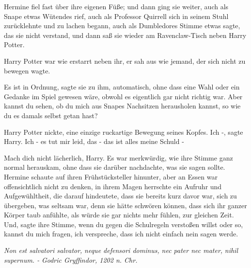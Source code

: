 Hermine fiel fast über ihre eigenen Füße; und dann ging sie weiter, auch als
Snape etwas Wütendes rief, auch als Professor Quirrell sich in seinem Stuhl
zurücklehnte und zu lachen begann, auch als Dumbledores Stimme etwas sagte, das
sie nicht verstand, und dann saß sie wieder am Ravenclaw-Tisch neben Harry
Potter.

Harry Potter war wie erstarrt neben ihr, er sah aus wie jemand, der sich nicht
zu bewegen wagte.

\glqq{}Es ist in Ordnung\grqq{}, sagte sie zu ihm, automatisch, ohne dass eine
Wahl oder ein Gedanke im Spiel gewesen wäre, obwohl es eigentlich gar nicht
richtig war. \glqq{}Aber kannst du sehen, ob du mich aus Snapes Nachsitzen
herausholen kannst, so wie du es damals selbst getan hast?\grqq{}

Harry Potter nickte, eine einzige ruckartige Bewegung seines Kopfes. \glqq{}Ich
-\grqq{}, sagte Harry. \glqq{}Ich - es tut mir leid, das - das ist alles meine
Schuld -\grqq{}

\glqq{}Mach dich nicht lächerlich, Harry.\grqq{} Es war merkwürdig, wie ihre
Stimme ganz normal herauskam, ohne dass sie darüber nachdachte, was sie sagen
sollte. Hermine schaute auf ihren Frühstücksteller hinunter, aber an Essen war
offensichtlich nicht zu denken, in ihrem Magen herrschte ein Aufruhr und
Aufgewühltheit, die darauf hindeutete, dass sie bereits kurz davor war, sich zu
übergeben, was seltsam war, denn sie hätte schwören können, dass sich ihr ganzer
Körper taub anfühlte, als würde sie gar nichts mehr fühlen, zur gleichen Zeit.
\glqq{}Und\grqq{}, sagte ihre Stimme, \glqq{}wenn du gegen die Schulregeln
verstoßen willst oder so, kannst du mich fragen, ich verspreche, dass ich nicht
einfach nein sagen werde.\grqq{}

\emph{Non est salvatori salvator,} \emph{neque defensori dominus,} \emph{nec
pater nec mater,} \emph{nihil supernum. -} \emph{Godric Gryffindor, 1202 n. Chr.
}

